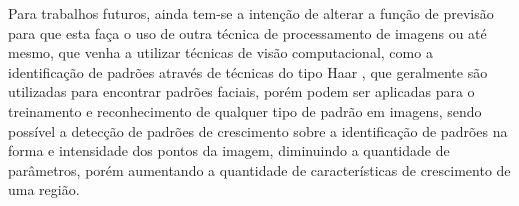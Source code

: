 Para trabalhos futuros, ainda tem-se a intenção de alterar a função de previsão para que esta faça o uso de outra técnica de processamento de imagens ou até mesmo, que venha a utilizar técnicas de visão computacional, como a identificação de padrões através de técnicas do tipo Haar \cite{mita2005joint}, que geralmente são utilizadas para encontrar padrões faciais, porém podem ser aplicadas para o treinamento e reconhecimento de qualquer tipo de padrão em imagens, sendo possível a detecção de padrões de crescimento sobre a identificação de padrões na forma e intensidade dos pontos da imagem, diminuindo a quantidade de parâmetros, porém aumentando a quantidade de características de crescimento de uma região.


